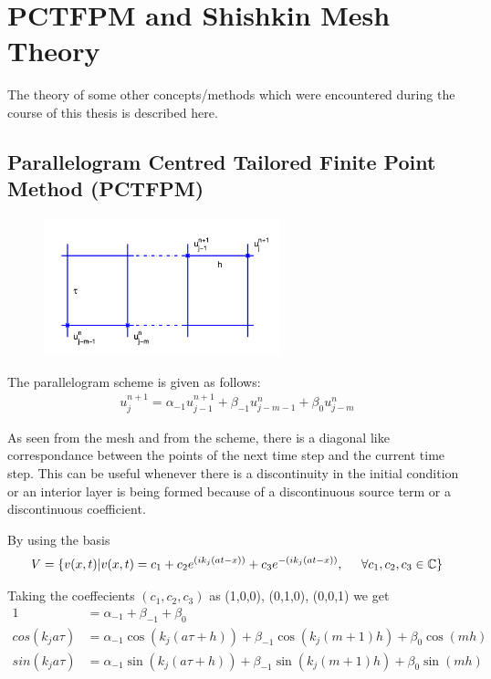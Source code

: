 
\chapter{PCTFPM and Shishkin Mesh Theory}

\label{Chapter3} %


The theory of some other concepts/methods which were encountered during the course of this thesis is described here.

\section{Parallelogram Centred Tailored Finite Point Method (PCTFPM)}

\begin{figure}[htbp]
	\centering
		\includegraphics[height=4cm]{Figures/mesh_PCTFPM.png}\\
	\caption[RCTFPM imaginary part]{}
\end{figure}
The parallelogram scheme is given as follows:
\begin{align*}
 u_{j}^{n+1} = \alpha_{-1}u_{j-1}^{n+1}+\beta_{-1}u_{j-m-1}^{n}+\beta_{0}u_{j-m}^{n}
\end{align*}

As seen from the mesh and from the scheme, there is a diagonal like correspondance between the points of the next time step and the current
time step. This can be useful whenever there is a discontinuity in the initial condition or an interior layer is being formed because 
of a discontinuous source term or a discontinuous coefficient.

By using the basis
\begin{align*}
 V = {\{} v(x,t)|v(x,t) =  c_{1} + c_{2}e^{(ik_{j}(at-x))} + c_{3}e^{-(ik_{j}(at-x))}, \hspace{0.5cm} \forall c_{1}, c_{2}, c_{3} \in \mathbb{C} {\}}  
\end{align*}

Taking the coeffecients $(c_1, c_2, c_3)$ as (1,0,0), (0,1,0), (0,0,1) we get
\begin{align*}
 1 &= \alpha_{-1} + \beta_{-1} + \beta_{0} \\
 cos(k_{j}a \tau ) &= \alpha_{-1}\cos(k_{j}(a \tau + h)) + \beta_{-1}\cos(k_{j}(m+1)h) + \beta_{0}\cos(mh)\\
 sin(k_{j}a \tau ) &= \alpha_{-1}\sin(k_{j}(a \tau + h)) + \beta_{-1}\sin(k_{j}(m+1)h) + \beta_{0}\sin(mh)
\end{align*}

